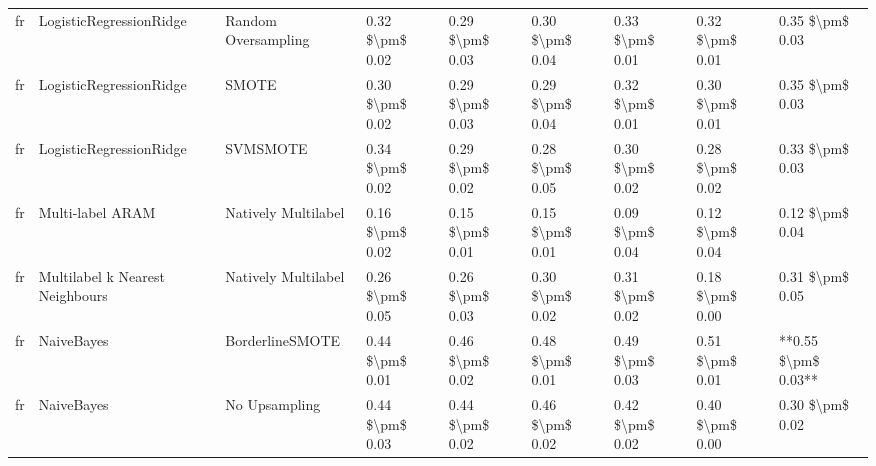 \begin{tabular}{lllllllll}
      fr &         LogisticRegressionRidge &           Random Oversampling & 0.32 \$\textbackslash pm\$ 0.02 &           0.29 \$\textbackslash pm\$ 0.03 &       0.30 \$\textbackslash pm\$ 0.04 &        0.33 \$\textbackslash pm\$ 0.01 &                         0.32 \$\textbackslash pm\$ 0.01 &     0.35 \$\textbackslash pm\$ 0.03 \\
      fr &         LogisticRegressionRidge &                         SMOTE & 0.30 \$\textbackslash pm\$ 0.02 &           0.29 \$\textbackslash pm\$ 0.03 &       0.29 \$\textbackslash pm\$ 0.04 &        0.32 \$\textbackslash pm\$ 0.01 &                         0.30 \$\textbackslash pm\$ 0.01 &     0.35 \$\textbackslash pm\$ 0.03 \\
      fr &         LogisticRegressionRidge &                      SVMSMOTE & 0.34 \$\textbackslash pm\$ 0.02 &           0.29 \$\textbackslash pm\$ 0.02 &       0.28 \$\textbackslash pm\$ 0.05 &        0.30 \$\textbackslash pm\$ 0.02 &                         0.28 \$\textbackslash pm\$ 0.02 &     0.33 \$\textbackslash pm\$ 0.03 \\
      fr &                Multi-label ARAM &           Natively Multilabel & 0.16 \$\textbackslash pm\$ 0.02 &           0.15 \$\textbackslash pm\$ 0.01 &       0.15 \$\textbackslash pm\$ 0.01 &        0.09 \$\textbackslash pm\$ 0.04 &                         0.12 \$\textbackslash pm\$ 0.04 &     0.12 \$\textbackslash pm\$ 0.04 \\
      fr & Multilabel k Nearest Neighbours &           Natively Multilabel & 0.26 \$\textbackslash pm\$ 0.05 &           0.26 \$\textbackslash pm\$ 0.03 &       0.30 \$\textbackslash pm\$ 0.02 &        0.31 \$\textbackslash pm\$ 0.02 &                         0.18 \$\textbackslash pm\$ 0.00 &     0.31 \$\textbackslash pm\$ 0.05 \\
      fr &                      NaiveBayes &               BorderlineSMOTE & 0.44 \$\textbackslash pm\$ 0.01 &           0.46 \$\textbackslash pm\$ 0.02 &       0.48 \$\textbackslash pm\$ 0.01 &        0.49 \$\textbackslash pm\$ 0.03 &                         0.51 \$\textbackslash pm\$ 0.01 & **0.55 \$\textbackslash pm\$ 0.03** \\
      fr &                      NaiveBayes &                 No Upsampling & 0.44 \$\textbackslash pm\$ 0.03 &           0.44 \$\textbackslash pm\$ 0.02 &       0.46 \$\textbackslash pm\$ 0.02 &        0.42 \$\textbackslash pm\$ 0.02 &                         0.40 \$\textbackslash pm\$ 0.00 &     0.30 \$\textbackslash pm\$ 0.02 \\

\end{tabular}
